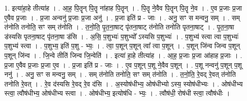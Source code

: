 \documentclass[17pt]{extarticle}
\begin{document}
1. इत्या॑हा॒हे तीत्या॑ह । . आ॒ह॒ पि॒तॄन् पि॒तॄ ना॑हाह पि॒तॄन् । . पि॒तॄ ने॒वैव पि॒तॄन् पि॒तॄ ने॒व । . ए॒व प्र॒जाः प्र॒जा ए॒वैव प्र॒जाः । . प्र॒जा अन्वनु॑ प्र॒जाः प्र॒जा अनु॑ । . प्र॒जा इति॑ प्र - जाः । . अनु॒ सꣳ स मन्वनु॒ सम् । . सम् त॑नोति तनोति॒ सꣳ सम् त॑नोति । . त॒नो॒ति॒ पृ॒त॒ना॒षाट् पृ॑तना॒षाट् त॑नोति तनोति पृतना॒षाट् । . पृ॒त॒ना॒षा ड॑स्यसि पृतना॒षाट् पृ॑तना॒षा ड॑सि । . अ॒सि॒ प॒शुभ्यः॑ प॒शुभ्यो᳚ ऽस्यसि प॒शुभ्यः॑ । . प॒शुभ्य॑ स्त्वा त्वा प॒शुभ्यः॑ प॒शुभ्य॑ स्त्वा । . प॒शुभ्य॒ इति॑ प॒शु - भ्यः॒ । . त्वा॒ प॒शून् प॒शून् त्वा᳚ त्वा प॒शून् । . प॒शून् जि॑न्व जिन्व प॒शून् प॒शून् जि॑न्व । . जि॒न्वे तीति॑ जिन्व जि॒न्वेति॑ । . इत्या॑ हा॒हे तीत्या॑ह । . आ॒ह॒ प्र॒जाः प्र॒जा आ॑हाह प्र॒जाः । . प्र॒जा ए॒वैव प्र॒जाः प्र॒जा ए॒व । . प्र॒जा इति॑ प्र - जाः । . ए॒व प॒शून् प॒शू ने॒वैव प॒शून् । . प॒शू नन्वनु॑ प॒शून् प॒शू ननु॑ । . अनु॒ सꣳ स मन्वनु॒ सम् । . सम् त॑नोति तनोति॒ सꣳ सम् त॑नोति । . त॒नो॒ति॒ रे॒वद् रे॒वत् त॑नोति तनोति रे॒वत् । . रे॒व द॑स्यसि रे॒वद् रे॒व द॑सि । . अ॒स्योष॑धीभ्य॒ ओष॑धीभ्यो ऽस्य॒ स्योष॑धीभ्यः । . ओष॑धीभ्य स्त्वा॒ त्वौष॑धीभ्य॒ ओष॑धीभ्य स्त्वा । . ओष॑धीभ्य॒ इत्योष॑धि - भ्यः॒ । . त्वौष॑धी॒ रोष॑धी स्त्वा॒ त्वौष॑धीः । \newline
\end{document}
